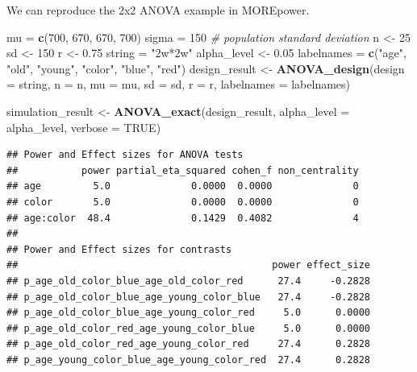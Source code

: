 \documentclass[]{book}
\newenvironment{Shaded}{\begin{snugshade}}{\end{snugshade}}
\newcommand{\CommentTok}[1]{\textcolor[rgb]{0.56,0.35,0.01}{\textit{#1}}}
\newcommand{\DataTypeTok}[1]{\textcolor[rgb]{0.13,0.29,0.53}{#1}}
\newcommand{\DecValTok}[1]{\textcolor[rgb]{0.00,0.00,0.81}{#1}}
\newcommand{\FloatTok}[1]{\textcolor[rgb]{0.00,0.00,0.81}{#1}}
\newcommand{\KeywordTok}[1]{\textcolor[rgb]{0.13,0.29,0.53}{\textbf{#1}}}
\newcommand{\NormalTok}[1]{#1}
\newcommand{\OtherTok}[1]{\textcolor[rgb]{0.56,0.35,0.01}{#1}}
\newcommand{\StringTok}[1]{\textcolor[rgb]{0.31,0.60,0.02}{#1}}
\begin{document}
We can reproduce the 2x2 ANOVA example in MOREpower.

\begin{Shaded}
\begin{Highlighting}[]
\NormalTok{mu =}\StringTok{ }\KeywordTok{c}\NormalTok{(}\DecValTok{700}\NormalTok{, }\DecValTok{670}\NormalTok{, }\DecValTok{670}\NormalTok{, }\DecValTok{700}\NormalTok{) }
\NormalTok{sigma =}\StringTok{ }\DecValTok{150}  \CommentTok{# population standard deviation}
\NormalTok{n <-}\StringTok{ }\DecValTok{25}
\NormalTok{sd <-}\StringTok{ }\DecValTok{150}
\NormalTok{r <-}\StringTok{ }\FloatTok{0.75}
\NormalTok{string =}\StringTok{ "2w*2w"}
\NormalTok{alpha_level <-}\StringTok{ }\FloatTok{0.05}
\NormalTok{labelnames =}\StringTok{ }\KeywordTok{c}\NormalTok{(}\StringTok{"age"}\NormalTok{, }\StringTok{"old"}\NormalTok{, }\StringTok{"young"}\NormalTok{, }\StringTok{"color"}\NormalTok{, }\StringTok{"blue"}\NormalTok{, }\StringTok{"red"}\NormalTok{)}
\NormalTok{design_result <-}\StringTok{ }\KeywordTok{ANOVA_design}\NormalTok{(}\DataTypeTok{design =}\NormalTok{ string,}
                              \DataTypeTok{n =}\NormalTok{ n, }
                              \DataTypeTok{mu =}\NormalTok{ mu, }
                              \DataTypeTok{sd =}\NormalTok{ sd, }
                              \DataTypeTok{r =}\NormalTok{ r, }
                              \DataTypeTok{labelnames =}\NormalTok{ labelnames)}

\NormalTok{simulation_result <-}\StringTok{ }\KeywordTok{ANOVA_exact}\NormalTok{(design_result, }
                                 \DataTypeTok{alpha_level =}\NormalTok{ alpha_level, }
                                 \DataTypeTok{verbose =} \OtherTok{TRUE}\NormalTok{)}
\end{Highlighting}
\end{Shaded}

\begin{verbatim}
## Power and Effect sizes for ANOVA tests
##           power partial_eta_squared cohen_f non_centrality
## age         5.0              0.0000  0.0000              0
## color       5.0              0.0000  0.0000              0
## age:color  48.4              0.1429  0.4082              4
## 
## Power and Effect sizes for contrasts
##                                            power effect_size
## p_age_old_color_blue_age_old_color_red      27.4     -0.2828
## p_age_old_color_blue_age_young_color_blue   27.4     -0.2828
## p_age_old_color_blue_age_young_color_red     5.0      0.0000
## p_age_old_color_red_age_young_color_blue     5.0      0.0000
## p_age_old_color_red_age_young_color_red     27.4      0.2828
## p_age_young_color_blue_age_young_color_red  27.4      0.2828
\end{verbatim}
\end{document}
